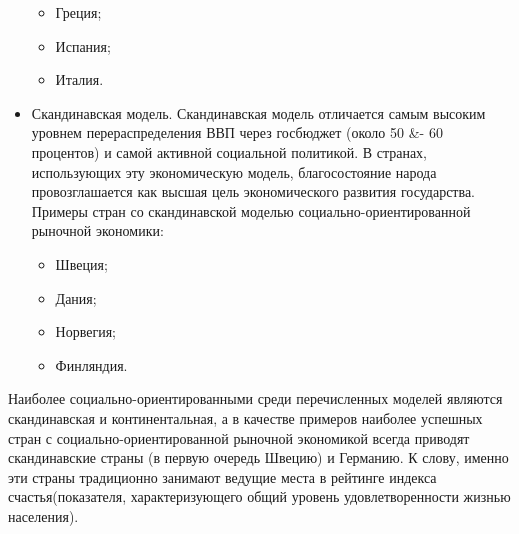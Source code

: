 \documentclass[14pt,a4paper]{article}
\begin{document}
\begin{itemize}
        \begin{itemize}
            \item Греция;
            \item Испания;
            \item Италия.
        \end{itemize}
        \item Скандинавская модель.
        Скандинавская модель отличается самым высоким уровнем перераспределения ВВП через госбюджет
        (около 50 \&- 60 процентов) и самой активной социальной политикой. В странах, использующих эту
        экономическую модель, благосостояние народа провозглашается как высшая цель экономического
        развития государства.
        Примеры стран со скандинавской моделью социально-ориентированной рыночной экономики:
        \begin{itemize}
            \item Швеция;
            \item Дания;
            \item Норвегия;
            \item Финляндия.
        \end{itemize}
    \end{itemize}
    \par
    Наиболее социально-ориентированными среди перечисленных моделей являются скандинавская и
    континентальная, а в качестве примеров наиболее успешных стран с
    социально-ориентированной рыночной экономикой всегда приводят скандинавские страны (в
    первую очередь Швецию) и Германию. К слову, именно эти страны традиционно
    занимают ведущие места в рейтинге индекса счастья(показателя, характеризующего
    общий уровень удовлетворенности жизнью населения).
\end{document}
